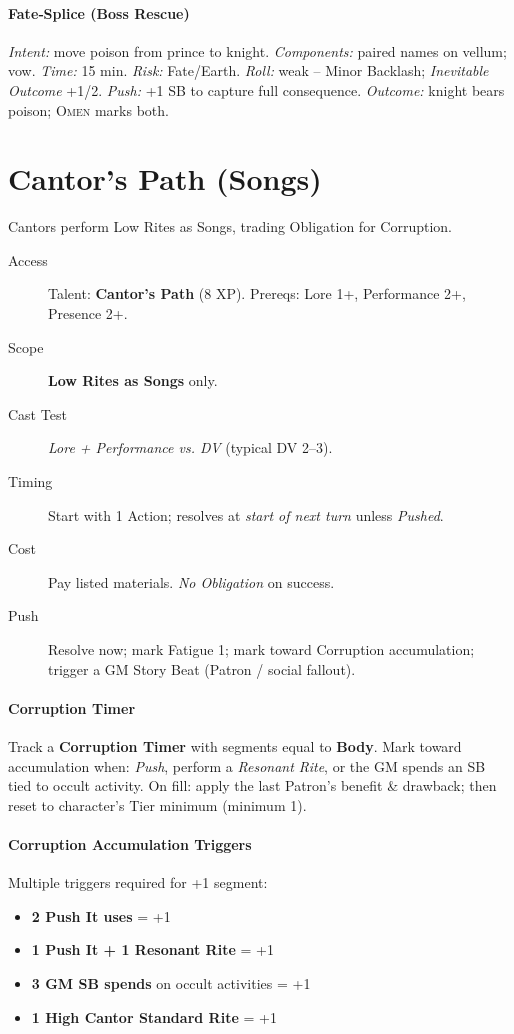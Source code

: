 \paragraph{Fate‑Splice (Boss Rescue)} \emph{Intent:} move poison from prince to knight. \emph{Components:} paired names on vellum; vow. \emph{Time:} 15 min. \emph{Risk:} Fate/Earth. \emph{Roll:} weak -- Minor Backlash; \emph{Inevitable Outcome} +1/2. \emph{Push:} +1 SB to capture full consequence. \emph{Outcome:} knight bears poison; \textsc{Omen} marks both.

\section{Cantor's Path (Songs)}\label{sec:cantors_path}

Cantors perform Low Rites as Songs, trading Obligation for Corruption.

\begin{description}
    \item[Access] Talent: \textbf{Cantor's Path} (8 XP). Prereqs: Lore 1+, Performance 2+, Presence 2+.
    \item[Scope] \textbf{Low Rites as Songs} only.
    \item[Cast Test] \emph{Lore + Performance vs. DV} (typical DV 2--3).
    \item[Timing] Start with 1 Action; resolves at \emph{start of next turn} unless \emph{Pushed}.
    \item[Cost] Pay listed materials. \emph{No Obligation} on success.
    \item[Push] Resolve now; mark Fatigue 1; mark toward Corruption accumulation; trigger a GM Story Beat (Patron / social fallout).
\end{description}

\paragraph{Corruption Timer }
Track a \textbf{Corruption Timer } with segments equal to \textbf{Body}. Mark toward accumulation when: \emph{Push}, perform a \emph{Resonant Rite}, or the GM spends an SB tied to occult activity. On fill: apply the last Patron's benefit \& drawback; then reset to character's Tier minimum (minimum 1).

\paragraph{Corruption Accumulation Triggers}
Multiple triggers required for +1 segment:
\begin{itemize}
    \item \textbf{2 Push It uses} = +1
    \item \textbf{1 Push It + 1 Resonant Rite} = +1
    \item \textbf{3 GM SB spends} on occult activities = +1
    \item \textbf{1 High Cantor Standard Rite} = +1
\end{itemize}

